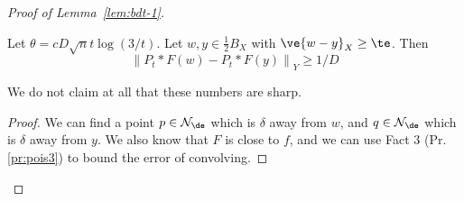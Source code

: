 \begin{proof}[Proof of Lemma~\ref{lem:bdt-1}]
\begin{clm}
Let $\theta = cD\sqrt{n} t\log(3/t)$. 
Let $w, y \in \frac{1}{2}B_X$ with $\ve{w-y}_X\ge \te$. Then
\[
\left\|P_t * F(w) - P_t*F(y)\right\|_Y \geq 1/D
\]
\end{clm}
We do not claim at all that these numbers are sharp. 
\begin{proof}
We can find a point $p\in \cal N_\de$ which is $\delta$ away from $w$, and $q \in \cal N_{\de}$ which is $\delta$ away from $y$. We also know that $F$ is close to $f$, and we can use Fact 3 (Pr. \ref{pr:pois3}) to bound the error of convolving. 



\end{proof}
\end{proof}
